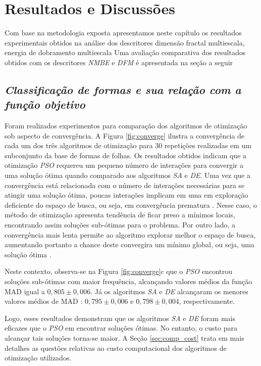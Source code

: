 
\chapter{Resultados e Discussões \label{chap:resultados}}

Com base na metodologia exposta apresentamos neste capítulo os resultados experimentais obtidos na análise dos descritores dimensão fractal multiescala, energia de dobramento multiescala Uma avaliação comparativa dos resultados obtidos com os descritores \emph{NMBE} e \emph{DFM} é apresentada na seção a seguir 

{\color{blue}

\section{\emph{Classificação de formas e sua relação com  a função objetivo}}
Foram realizados experimentos para comparação dos algoritmos de otimização sob aspecto de convergência. A Figura \ref{fig:converge} ilustra a convergência de cada um dos três algoritmos de otimização para $30$ repetições realizadas em um subconjunto da base de formas de folhas. Os resultados obtidos indicam que a otimização \emph{PSO} requereu um pequeno número de interações para convergir a uma solução ótima quando comparado aos algoritmos \emph{SA} e \emph{DE}. Uma vez que a convergência está relacionada com o número de interações necessárias para se atingir uma solução ótima, poucas interações implicam em uma em exploração deficiente do espaço de busca, ou seja, em convergência prematura . Nesse caso, o método de otimização apresenta tendência de ficar preso a mínimos locais, encontrando assim soluções sub-ótimas para o problema. Por outro lado, a convergência mais lenta permite ao algoritmo explorar melhor o espaço de busca, aumentando portanto a chance deste convergira um mínimo global, ou seja, uma solução ótima .
 
Neste contexto, observa-se na Figura \ref{fig:converge}c que o \emph{PSO} encontrou soluções sub-ótimas com maior frequência, alcançando valores médios da função MAD  igual a $0,805 \pm 0,006$.  Já os algoritmos \emph{SA} e \emph{DE} alcançaram os menores valores médios de MAD : $0,795 \pm 0,006$ e $0,798 \pm 0,004$, respectivamente. 

Logo, esses resultados demonstram que os algoritmos \emph{SA} e \emph{DE} foram mais eficazes que o \emph{PSO} em encontrar soluções ótimas. No entanto, o custo para alcançar tais soluções torna-se maior. A Seção \ref{sec:comp_cost} trata em mais detalhes as questões relativas ao custo computacional dos algoritmos de otimização utilizados.

}
